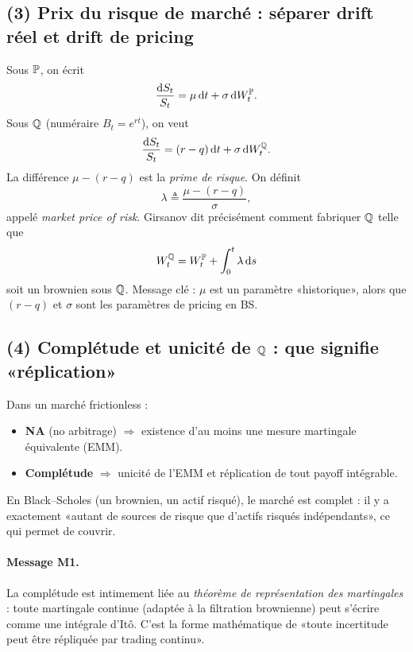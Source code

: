 \subsection*{(3) Prix du risque de marché : séparer drift réel et drift de pricing}
Sous $\mathbb{P}$, on écrit
\[
\frac{\mathrm{d} S_t}{S_t}=\mu\,\mathrm{d} t+\sigma\,\mathrm{d} W_t^{\mathbb{P}}.
\]
Sous $\mathbb{Q}$ (numéraire $B_t=e^{rt}$), on veut
\[
\frac{\mathrm{d} S_t}{S_t}=(r-q)\,\mathrm{d} t+\sigma\,\mathrm{d} W_t^{\mathbb{Q}}.
\]
La différence $\mu-(r-q)$ est la \emph{prime de risque}. On définit
\[
\lambda \triangleq \frac{\mu-(r-q)}{\sigma},
\]
appelé \emph{market price of risk}.
Girsanov dit précisément comment fabriquer $\mathbb{Q}$ telle que
\[
W_t^{\mathbb{Q}}=W_t^{\mathbb{P}}+\int_0^t \lambda\,\mathrm{d} s
\]
soit un brownien sous $\mathbb{Q}$.
Message clé : $\mu$ est un paramètre «historique», alors que $(r-q)$ et $\sigma$ sont les paramètres de pricing en BS.

\subsection*{(4) Complétude et unicité de $\mathbb{Q}$ : que signifie «réplication»}
Dans un marché frictionless :
\begin{itemize}[leftmargin=*]
\item \textbf{NA} (no arbitrage) $\Rightarrow$ existence d'au moins une mesure martingale équivalente (EMM).
\item \textbf{Complétude} $\Rightarrow$ unicité de l'EMM et réplication de tout payoff intégrable.
\end{itemize}
En Black--Scholes (un brownien, un actif risqué), le marché est complet : il y a exactement «autant de sources de risque que d'actifs risqués indépendants», ce qui permet de couvrir.
\paragraph{Message M1.}
La complétude est intimement liée au \emph{théorème de représentation des martingales} : toute martingale continue (adaptée à la filtration brownienne) peut s'écrire comme une intégrale d'Itô. C'est la forme mathématique de «toute incertitude peut être répliquée par trading continu».

